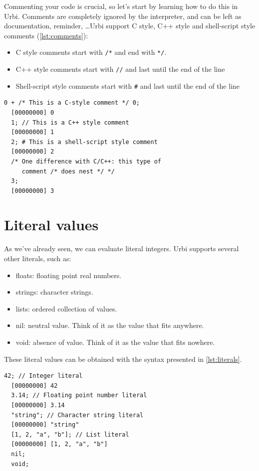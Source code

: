 \documentclass[openright,twoside,12pt]{report}
\newcommand{\C}{C\xspace}
\newcommand{\Cxx}{C++\xspace}
\newcommand{\urbi}{Urbi\xspace}
\newcommand{\lst}[1]{\autoref{lst:#1}}
\begin{document}
Commenting your code is crucial, so let's start by learning how to do
this in \urbi. Comments are completely ignored by the interpreter, and
can be left as documentation, reminder, \ldots \urbi support \C style,
\Cxx style and shell-script style comments (\lst{comments}):

\begin{itemize}
\item \C style comments start with \texttt{/*} and end with \texttt{*/}.
\item \C++ style comments start with \texttt{//} and last until the
  end of the line
\item Shell-script style comments start with \texttt{\#} and last
  until the end of the line
\end{itemize}


\begin{lstlisting}[caption=Comments in \urbi, label=lst:comments]
  0 + /* This is a C-style comment */ 0;
  [00000000] 0
  1; // This is a C++ style comment
  [00000000] 1
  2; # This is a shell-script style comment
  [00000000] 2
  /* One difference with C/C++: this type of
     comment /* does nest */ */
  3;
  [00000000] 3
\end{lstlisting}


\section{Literal values}

As we've already seen, we can evaluate literal integers. \urbi
supports several other literals, such as:

\begin{itemize}
\item floats: floating point real numbers.
\item strings: character strings.
\item lists: ordered collection of values.
\item nil: neutral value. Think of it as the value that fits anywhere.
\item void: absence of value. Think of it as the value that fits nowhere.
\end{itemize}

These literal values can be obtained with the syntax presented in
\lst{literals}.

\begin{lstlisting}[caption=Literals,label=lst:literals]
  42; // Integer literal
  [00000000] 42
  3.14; // Floating point number literal
  [00000000] 3.14
  "string"; // Character string literal
  [00000000] "string"
  [1, 2, "a", "b"]; // List literal
  [00000000] [1, 2, "a", "b"]
  nil;
  void;
\end{lstlisting}
\end{document}
